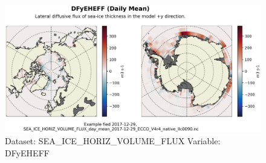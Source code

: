 \begin{figure}[H]
\centering
\includegraphics[width=\textwidth]{../images/plots/native_plots/Sea-Ice_and_Snow_Horizontal_Volume_Fluxes/DFyEHEFF.png}
\caption{Dataset: SEA\_ICE\_HORIZ\_VOLUME\_FLUX Variable: DFyEHEFF}
\label{tab:table-SEA_ICE_HORIZ_VOLUME_FLUX_DFyEHEFF-Plot}
\end{figure}
\pagebreak

